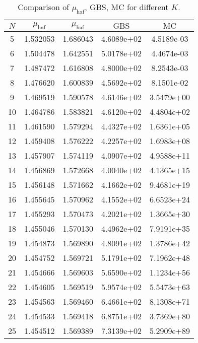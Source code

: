 \begin{table}[h!]
    \centering
    \begin{tabular}{|c|c|c|c|c|}
    \hline
    $N$ & $\mu_{\text{haf}}$ & $\mu_{\text{haf}}$ & $\text{GBS}$ & $\text{MC}$\\ 
    \hline
5&1.532053 &1.686043 &  4.6089e+02 & 4.5189e-03\\
6&1.504478 &1.642551 &  5.0178e+02 & 4.4674e-03\\
7&1.487472 &1.616808 &  4.8000e+02 & 8.2543e-03\\
8&1.476620 &1.600839 &  4.5692e+02 & 8.1501e-02\\
9&1.469519 &1.590578 &  4.6146e+02 & 3.5479e+00\\
10&1.464786 &1.583821 &  4.6120e+02 & 4.4804e+02\\
11&1.461590 &1.579294 &  4.4327e+02 & 1.6361e+05\\
12&1.459408 &1.576222 &  4.2257e+02 & 1.6983e+08\\
13&1.457907 &1.574119 &  4.0907e+02 & 4.9588e+11\\
14&1.456869 &1.572668 &  4.0040e+02 & 4.1365e+15\\
15&1.456148 &1.571662 &  4.1662e+02 & 9.4681e+19\\
16&1.455645 &1.570962 &  4.1552e+02 & 6.6523e+24\\
17&1.455293 &1.570473 &  4.2021e+02 & 1.3665e+30\\
18&1.455046 &1.570130 &  4.4962e+02 & 7.9191e+35\\
19&1.454873 &1.569890 &  4.8091e+02 & 1.3786e+42\\
20&1.454752 &1.569721 &  5.1791e+02 & 7.1962e+48\\
21&1.454666 &1.569603 &  5.6590e+02 & 1.1234e+56\\
22&1.454605 &1.569519 &  5.9574e+02 & 5.5473e+63\\
23&1.454563 &1.569460 &  6.4661e+02 & 8.1308e+71\\
24&1.454533 &1.569418 &  6.8751e+02 & 3.7369e+80\\
25&1.454512 &1.569389 &  7.3139e+02 & 5.2909e+89\\
\hline
    \end{tabular}
    \caption{Comparison of $\mu_{\text{haf}}$, GBS, MC for different $K$.}
    \label{tab:comparison}
    \end{table}